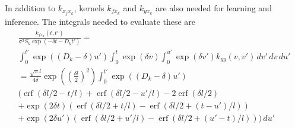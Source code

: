 \documentclass[a4paper]{article}
\newcommand{\erf}{\operatorname{erf}}
\begin{document}
In addition to $k_{x_j x_k}$, kernels $k_{f x_k}$ and $k_{y x_k}$ are
also needed for learning and inference.  The integrals needed to
evaluate these are
\begin{multline}
  \frac{k_{f x_k}(t, t')}{\sigma^2 S_k \exp(-\delta t - D_k t')} =  \\
  \int_0^{t'} \exp((D_k - \delta) u') \int_0^t \exp(\delta v) \int_0^{u'}
  \exp(\delta v') k_{yy}(v, v')\, dv'\, dv\, du' \\
  = 
  \frac{\sqrt{\pi}l}{4\delta}\exp\left(\left(\frac{\delta l}{2}\right)^2\right)
  \int_0^{t'} \exp((D_k - \delta) u') \\
  \bigg(
  \erf(\delta l/2 - t/l)
  + \erf(\delta l/2 - u'/l) - 2 \erf(\delta l/2) \\
  + \exp(2 \delta t) (\erf(\delta l/2 + t/l) - \erf(\delta l/2 +
  (t-u')/l)) \\
  + \exp(2 \delta u') (\erf(\delta l/2 + u'/l) - \erf(\delta l/2
  + (u'-t)/l))
  \bigg)
  \, du' \\

\end{multline}
\end{document}
